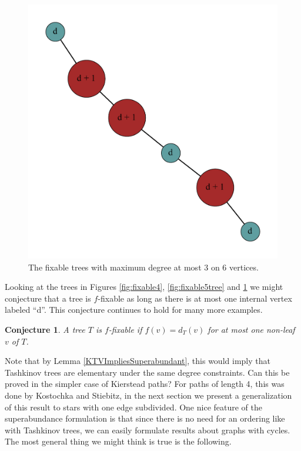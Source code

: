 \documentclass[12pt]{article}
\theoremstyle{plain}
\newtheorem{conjecture}[thm]{Conjecture}
\theoremstyle{definition}
\theoremstyle{remark}
\begin{document}
\begin{figure}[htb]
					\includegraphics[scale=0.25]{Superabundance/MaxDegree3Trees/001010011010000[3,2,1,1,3,3].pdf}
					\caption{The fixable trees with maximum degree at most 3 on 6 vertices.}
					\label{fig:fixable6tree}
				\end{figure}

Looking at the trees in Figures \ref{fig:fixable4}, \ref{fig:fixable5tree} and \ref{fig:fixable6tree} we might conjecture that a tree is $f$-fixable as long as there is at most one internal vertex labeled ``d''.  This conjecture continues to hold for many more examples.

\begin{conjecture}\label{OneHighConjecture}
	A tree $T$ is $f$-fixable if $f(v) = d_T(v)$ for at most one non-leaf $v$ of $T$.
\end{conjecture}

Note that by Lemma \ref{KTVImpliesSuperabundant}, this would imply that Tashkinov trees are elementary under the same degree constraints.  Can this be proved in the simpler case of Kierstead paths?  For paths of length 4, this was done by Kostochka and Stiebitz, in the next section we present a generalization of this result to stars with one edge subdivided.   One nice feature of the superabundance formulation is that since there is no need for an ordering like with Tashkinov trees, we can easily formulate results about graphs with cycles.  The most general thing we might think is true is the following.
\end{document}
